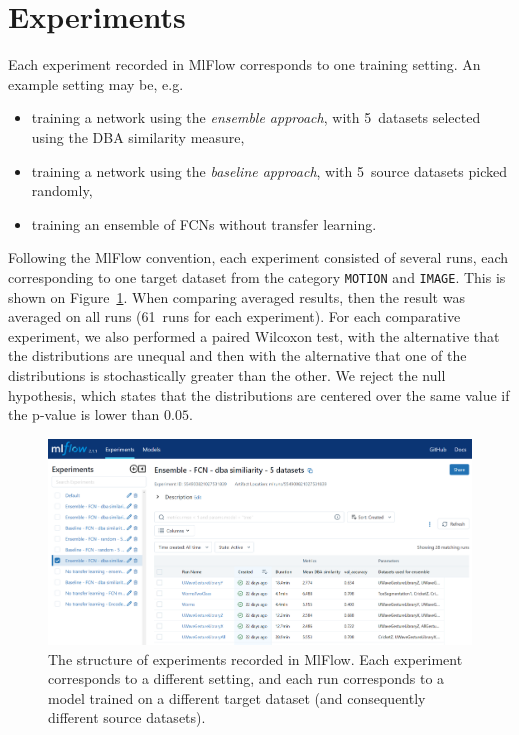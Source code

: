 \documentclass[a4paper,11pt,twoside]{report}
\theoremstyle{definition}
\begin{document}
\section{Experiments}
Each experiment recorded in MlFlow corresponds to one training setting. An example setting may be, e.g.~\begin{itemize}
\item training a network using the \textit{ensemble approach}, with 5~datasets selected using the DBA similarity measure,
 \item training a network using the \textit{baseline approach}, with 5~source datasets picked randomly,
 \item training an ensemble of FCNs without transfer learning.

\end{itemize}
Following the MlFlow convention, each experiment consisted of several runs, each corresponding to one target dataset from the category \texttt{MOTION} and \texttt{IMAGE}. This is shown on Figure~\ref{fig:mlflow_screnshot}. When comparing averaged results, then the result was averaged on all runs (61~runs for each experiment).
For each comparative experiment, we also performed a paired Wilcoxon test, with the alternative that the distributions are unequal and then with the alternative that one of the distributions is stochastically greater than the other.
We reject the null hypothesis, which states that the distributions are centered over the same value if the p-value is lower than $0.05$.
\FloatBarrier

\begin{figure}[h!t]
\centering
\includegraphics[width=17cm]{imgs/mlflow_screenshot.png}
\caption{The structure of experiments recorded in MlFlow. Each experiment corresponds to a different setting, and each run corresponds to a model trained on a different target dataset (and consequently different source datasets).}
\label{fig:mlflow_screnshot}
\end{figure}
\FloatBarrier
\end{document}
